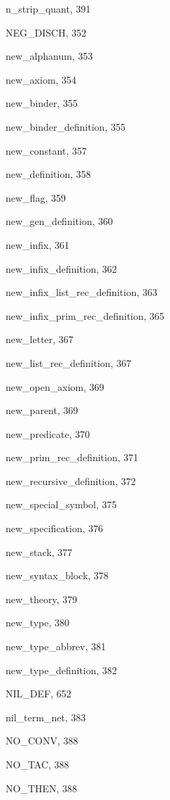 \begin{theindex}
  \item {\ptt n\_strip\_quant}, 391
  \item {\ptt NEG\_DISCH}, 352
  \item {\ptt new\_alphanum}, 353
  \item {\ptt new\_axiom}, 354
  \item {\ptt new\_binder}, 355
  \item {\ptt new\_binder\_definition}, 355
  \item {\ptt new\_constant}, 357
  \item {\ptt new\_definition}, 358
  \item {\ptt new\_flag}, 359
  \item {\ptt new\_gen\_definition}, 360
  \item {\ptt new\_infix}, 361
  \item {\ptt new\_infix\_definition}, 362
  \item {\ptt new\_infix\_list\_rec\_definition}, 363
  \item {\ptt new\_infix\_prim\_rec\_definition}, 365
  \item {\ptt new\_letter}, 367
  \item {\ptt new\_list\_rec\_definition}, 367
  \item {\ptt new\_open\_axiom}, 369
  \item {\ptt new\_parent}, 369
  \item {\ptt new\_predicate}, 370
  \item {\ptt new\_prim\_rec\_definition}, 371
  \item {\ptt new\_recursive\_definition}, 372
  \item {\ptt new\_special\_symbol}, 375
  \item {\ptt new\_specification}, 376
  \item {\ptt new\_stack}, 377
  \item {\ptt new\_syntax\_block}, 378
  \item {\ptt new\_theory}, 379
  \item {\ptt new\_type}, 380
  \item {\ptt new\_type\_abbrev}, 381
  \item {\ptt new\_type\_definition}, 382
  \item {\ptt NIL\_DEF}, 652
  \item {\ptt nil\_term\_net}, 383
  \item {\ptt NO\_CONV}, 388
  \item {\ptt NO\_TAC}, 388
  \item {\ptt NO\_THEN}, 388

\end{theindex}
